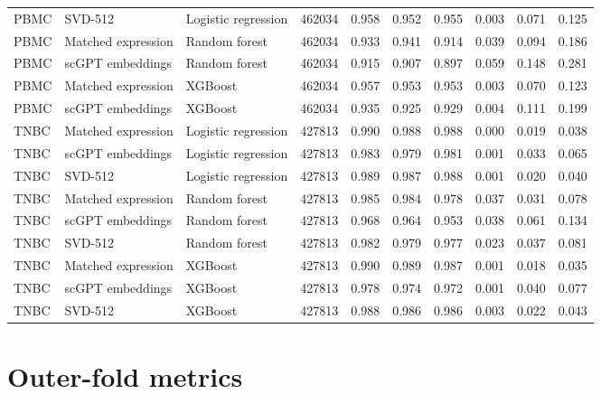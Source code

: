 {\begin{longtable}{lllrrrrrrr}
PBMC & SVD-512 & Logistic regression & 462034 & 0.958 & 0.952 & 0.955 & 0.003 & 0.071 & 0.125 \\
PBMC & Matched expression & Random forest & 462034 & 0.933 & 0.941 & 0.914 & 0.039 & 0.094 & 0.186 \\
PBMC & scGPT embeddings & Random forest & 462034 & 0.915 & 0.907 & 0.897 & 0.059 & 0.148 & 0.281 \\
PBMC & Matched expression & XGBoost & 462034 & 0.957 & 0.953 & 0.953 & 0.003 & 0.070 & 0.123 \\
PBMC & scGPT embeddings & XGBoost & 462034 & 0.935 & 0.925 & 0.929 & 0.004 & 0.111 & 0.199 \\
TNBC & Matched expression & Logistic regression & 427813 & 0.990 & 0.988 & 0.988 & 0.000 & 0.019 & 0.038 \\
TNBC & scGPT embeddings & Logistic regression & 427813 & 0.983 & 0.979 & 0.981 & 0.001 & 0.033 & 0.065 \\
TNBC & SVD-512 & Logistic regression & 427813 & 0.989 & 0.987 & 0.988 & 0.001 & 0.020 & 0.040 \\
TNBC & Matched expression & Random forest & 427813 & 0.985 & 0.984 & 0.978 & 0.037 & 0.031 & 0.078 \\
TNBC & scGPT embeddings & Random forest & 427813 & 0.968 & 0.964 & 0.953 & 0.038 & 0.061 & 0.134 \\
TNBC & SVD-512 & Random forest & 427813 & 0.982 & 0.979 & 0.977 & 0.023 & 0.037 & 0.081 \\
TNBC & Matched expression & XGBoost & 427813 & 0.990 & 0.989 & 0.987 & 0.001 & 0.018 & 0.035 \\
TNBC & scGPT embeddings & XGBoost & 427813 & 0.978 & 0.974 & 0.972 & 0.001 & 0.040 & 0.077 \\
TNBC & SVD-512 & XGBoost & 427813 & 0.988 & 0.986 & 0.986 & 0.003 & 0.022 & 0.043 \\
\end{longtable}
}

\clearpage\section{Outer-fold metrics}

